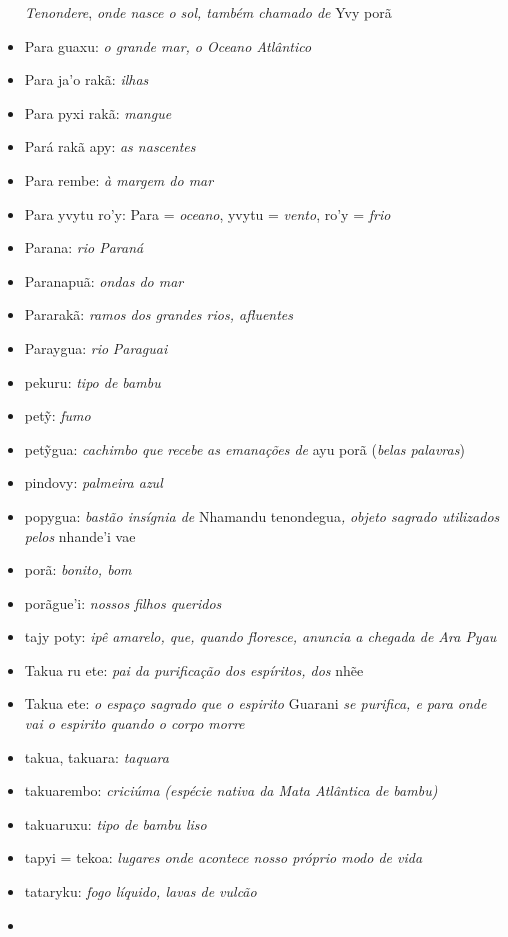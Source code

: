 \begin{itemize}
  \emph{Tenondere}, \emph{onde nasce o sol, também chamado de} Yvy porã
\item
  Para guaxu: \emph{o grande mar, o Oceano Atlântico}
\item
  Para ja'o rakã: \emph{ilhas}
\item
  Para pyxi rakã: \emph{mangue}
\item
  Pará rakã apy: \emph{as nascentes}
\item
  Para rembe: \emph{à margem do mar}
\item
  Para yvytu ro'y: Para = \emph{oceano}, yvytu = \emph{vento}, ro'y =
  \emph{frio}
\item
  Parana: \emph{rio Paraná}
\item
  Paranapuã: \emph{ondas do mar}
\item
  Pararakã: \emph{ramos dos grandes rios, afluentes}
\item
  Paraygua: \emph{rio} \emph{Paraguai}
\item
  pekuru: \emph{tipo de bambu}
\item
  petỹ: \emph{fumo}
\item
  petỹgua: \emph{cachimbo que} \emph{recebe} \emph{as emanações de} ayu
  porã (\emph{belas palavras})
\item
  pindovy: \emph{palmeira azul}
\item
  popygua: \emph{bastão insígnia de} Nhamandu
  tenondegua\emph{,} \emph{objeto sagrado utilizados pelos} nhande'i vae
\item
  porã: \emph{bonito, bom}
\item
  porãgue'i: \emph{nossos filhos queridos}
\item
  tajy poty: \emph{ipê amarelo, que, quando floresce, anuncia a chegada
  de Ara Pyau}
\item
  Takua ru ete: \emph{pai da purificação dos espíritos, dos} nhẽe
\item
  Takua ete: \emph{o espaço sagrado que o espirito} Guarani \emph{se
  purifica, e para onde vai o espirito quando o corpo morre}
\item
  takua, takuara: \emph{taquara}
\item
  takuarembo: \emph{criciúma} \emph{(espécie nativa da Mata Atlântica de
  bambu)}
\item
  takuaruxu: \emph{tipo de bambu liso}
\item
  tapyi = tekoa: \emph{lugares onde acontece nosso próprio modo de vida}
\item
  tataryku: \emph{fogo líquido, lavas de vulcão}
\item

\end{itemize}
